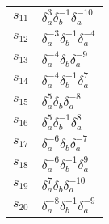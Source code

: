 \documentclass{article}
\begin{document}
\begin{center}
\begin{tabular}{ll}
$s_{11}$ & $\delta_a^{3}\delta_b^{-1}\delta_a^{-10}$ \\
$s_{12}$ & $\delta_a^{-3}\delta_b^{-1}\delta_a^{-4}$ \\
$s_{13}$ & $\delta_a^{-4}\delta_b^{}\delta_a^{-9}$ \\
$s_{14}$ & $\delta_a^{-4}\delta_b^{-1}\delta_a^{7}$ \\
$s_{15}$ & $\delta_a^{5}\delta_b^{}\delta_a^{-8}$ \\
$s_{16}$ & $\delta_a^{5}\delta_b^{-1}\delta_a^{8}$ \\
$s_{17}$ & $\delta_a^{-6}\delta_b^{}\delta_a^{-7}$ \\
$s_{18}$ & $\delta_a^{-6}\delta_b^{-1}\delta_a^{9}$ \\
$s_{19}$ & $\delta_a^{7}\delta_b^{}\delta_a^{-10}$ \\
$s_{20}$ & $\delta_a^{-8}\delta_b^{-1}\delta_a^{-9}$ \\
\bottomrule
\end{tabular}
\end{center}

\thispagestyle{empty}
\end{document}
